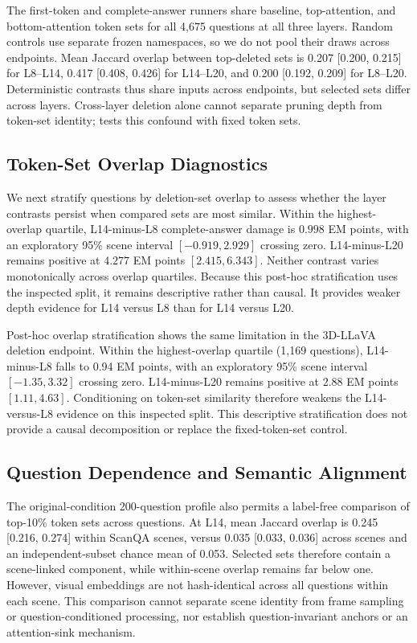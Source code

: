 The first-token and complete-answer runners share baseline, top-attention, and bottom-attention token sets for all 4,675 questions at all three layers. Random controls use separate frozen namespaces, so we do not pool their draws across endpoints. Mean Jaccard overlap between top-deleted sets is 0.207 [0.200, 0.215] for L8--L14, 0.417 [0.408, 0.426] for L14--L20, and 0.200 [0.192, 0.209] for L8--L20. Deterministic contrasts thus share inputs across endpoints, but selected sets differ across layers. Cross-layer deletion alone cannot separate pruning depth from token-set identity;  tests this confound with fixed token sets.

\subsection{Token-Set Overlap Diagnostics}
We next stratify questions by deletion-set overlap to assess whether the layer contrasts persist when compared sets are most similar. Within the highest-overlap quartile, L14-minus-L8 complete-answer damage is $0.998$ EM points, with an exploratory 95\% scene interval $[-0.919,2.929]$ crossing zero. L14-minus-L20 remains positive at $4.277$ EM points $[2.415,6.343]$. Neither contrast varies monotonically across overlap quartiles. Because this post-hoc stratification uses the inspected split, it remains descriptive rather than causal. It provides weaker depth evidence for L14 versus L8 than for L14 versus L20.

Post-hoc overlap stratification shows the same limitation in the 3D-LLaVA deletion endpoint. Within the highest-overlap quartile (1,169 questions), L14-minus-L8 falls to 0.94 EM points, with an exploratory 95\% scene interval $[-1.35,3.32]$ crossing zero. L14-minus-L20 remains positive at 2.88 EM points $[1.11,4.63]$. Conditioning on token-set similarity therefore weakens the L14-versus-L8 evidence on this inspected split. This descriptive stratification does not provide a causal decomposition or replace the fixed-token-set control.

\subsection{Question Dependence and Semantic Alignment}
The original-condition 200-question profile also permits a label-free comparison of top-10\% token sets across questions. At L14, mean Jaccard overlap is 0.245 [0.216, 0.274] within ScanQA scenes, versus 0.035 [0.033, 0.036] across scenes and an independent-subset chance mean of 0.053. Selected sets therefore contain a scene-linked component, while within-scene overlap remains far below one. However, visual embeddings are not hash-identical across all questions within each scene. This comparison cannot separate scene identity from frame sampling or question-conditioned processing, nor establish question-invariant anchors or an attention-sink mechanism.

